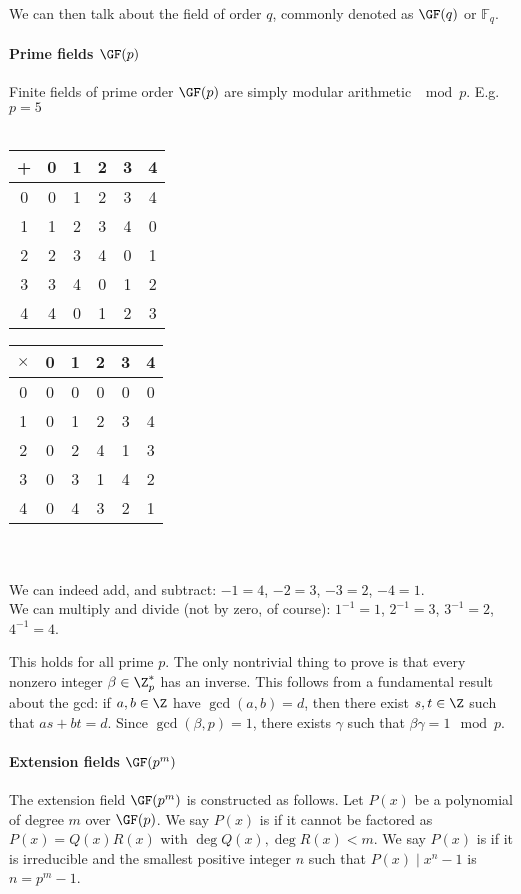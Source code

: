 \documentclass[a4paper, 11pt, openany]{book}
\begin{document}
We can then talk about the field of order $q$, commonly denoted as $\GF(q)$ or $\mathbb{F}_q$.



\paragraph{Prime fields $\GF(p)$}
Finite fields of prime order $\GF(p)$ are simply modular arithmetic $\mod p$. E.g. $p=5$\\
~\\
\begin{tabular}{c|ccccc}
	+ & 0 & 1 & 2 & 3 & 4\\
	\hline
	0 & 0 & 1 & 2 & 3 & 4\\
	1 & 1 & 2 & 3 & 4 & 0\\
	2 & 2 & 3 & 4 & 0 & 1\\
	3 & 3 & 4 & 0 & 1 & 2\\
	4 & 4 & 0 & 1 & 2 & 3
\end{tabular} \hspace{2cm}
\begin{tabular}{c|ccccc}
	$\times$ & 0 & 1 & 2 & 3 & 4\\
	\hline
	0 & 0 & 0 & 0 & 0 & 0\\
	1 & 0 & 1 & 2 & 3 & 4\\
	2 & 0 & 2 & 4 & 1 & 3\\
	3 & 0 & 3 & 1 & 4 & 2\\
	4 & 0 & 4 & 3 & 2 & 1
\end{tabular}
~\\
~\\
We can indeed add, and subtract: $-1 = 4$, $-2 = 3$, $-3 = 2$, $-4 = 1$.\\
We can multiply and divide (not by zero, of course): $1^{-1} = 1$, $2^{-1} = 3$, $3^{-1} = 2$, $4^{-1} = 4$.

This holds for all prime $p$. The only nontrivial thing to prove is that every nonzero integer $\beta \in \Z_p^*$ has an inverse. This follows from a fundamental result about the gcd: if $a,b \in \Z$ have $\gcd(a,b) = d$, then there exist $s, t \in \Z$ such that $as + bt = d$. Since $\gcd(\beta, p) = 1$, there exists $\gamma$ such that $\beta \gamma = 1 \mod p$.


\paragraph{Extension fields $\GF(p^m)$}
The extension field $\GF(p^m)$ is constructed as follows. Let $P(x)$ be a polynomial of degree $m$ over $\GF(p)$. We say $P(x)$ is  if it cannot be factored as $P(x) = Q(x)R(x)$ with $\deg Q(x), \deg R(x) < m$. We say $P(x)$ is  if it is irreducible and the smallest positive integer $n$ such that $P(x) \mid x^n - 1$ is $n = p^m-1$.
\end{document}
